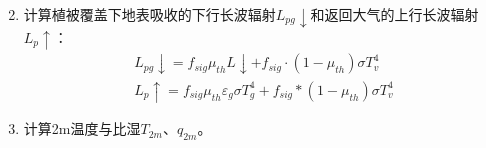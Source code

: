 \begin{enumerate}
\begin{equation}
    \end{equation}
    \item 计算植被覆盖下地表吸收的下行长波辐射$L_{pg}\downarrow$和返回大气的上行长波辐射$L_p\uparrow$：
    \begin{equation}
    \begin{array}{c}L_{pg} \downarrow=f_{sig} \mu_{th} L \downarrow+f_{sig} \cdot \left(1-\mu_{t h}\right) \sigma T_{v}^{4} \\
         L_{p} \uparrow=f_{sig} \mu_{t h} \varepsilon_{g} \sigma T_{g}^{4}+f_{sig} *\left(1-\mu_{t h}\right) \sigma T_{v}^{4}\end{array}
    \end{equation}
    \item 计算2m温度与比湿$T_{2m}$、$q_{2m}$。
\end{enumerate}

